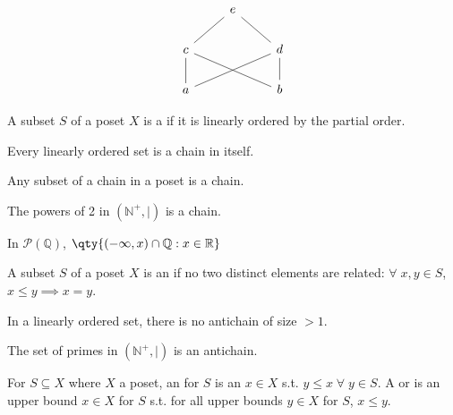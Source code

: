 \begin{example}
\begin{enumerate}
        \[\begin{tikzcd}
            & e \\
            c && d \\
            a && b
            \arrow[no head, from=3-1, to=2-1]
            \arrow[no head, from=2-1, to=1-2]
            \arrow[no head, from=3-3, to=2-3]
            \arrow[no head, from=2-3, to=1-2]
            \arrow[no head, from=3-1, to=2-3]
            \arrow[no head, from=3-3, to=2-1]
        \end{tikzcd}\]
    \end{enumerate}
\end{example}

\begin{definition}[Chain]
    A subset $S$ of a poset $X$ is a  if it is linearly ordered by the partial order.
\end{definition}

\begin{example}
    Every linearly ordered set is a chain in itself.
\end{example}

\begin{example}
    Any subset of a chain in a poset is a chain.
\end{example}

\begin{example}
    The powers of 2 in $(\mathbb N^+, \mid)$ is a chain.
\end{example}

\begin{example}
    In $\mathcal{P}(\mathbb{Q})$, $\qty{(-\infty, x) \cap \mathbb{Q} : x \in \mathbb{R}}$
\end{example}

\begin{definition}[Antichain]
    A subset $S$ of a poset $X$ is an  if no two distinct elements are related: $\forall \; x, y \in S$, $x \leq y \implies x = y$.
\end{definition}

\begin{example}
    In a linearly ordered set, there is no antichain of size $> 1$.
\end{example}

\begin{example}
    The set of primes in $(\mathbb N^+, \mid)$ is an antichain.
\end{example}

\begin{definition}[Supremum]
    For $S \subseteq X$ where $X$ a poset, an  for $S$ is an $x \in X$ s.t. $y \leq x \; \forall \; y \in S$.
    A  or  is an upper bound $x \in X$ for $S$ s.t. for all upper bounds $y \in X$ for $S$, $x \leq y$.
\end{definition}

